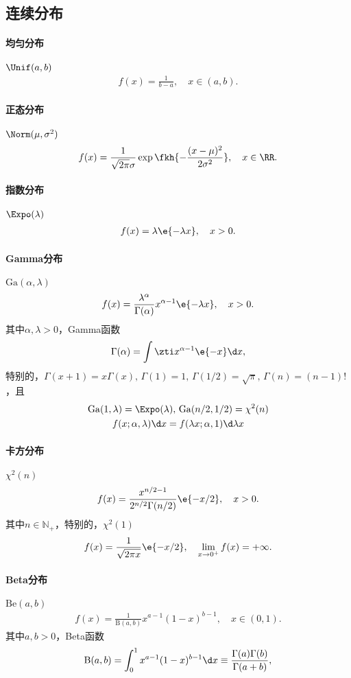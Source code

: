 \subsection{连续分布}
\paragraph{均匀分布}$\Unif(a,b)$
\begin{align}
	f(x)=\frac1{b-a},\quad x\in(a,b).
\end{align}
\paragraph{正态分布}$\Norm(\mu,\sigma^2)$
\begin{align}
	f(x)=\frac1{\sqrt{2\pi}\sigma}\exp\fkh{-\frac{(x-\mu)^2}{2\sigma^2}},\quad x\in\RR.
\end{align}
\paragraph{指数分布}$\Expo(\lambda)$
\begin{align}
	f(x)=\lambda\e{-\lambda x},\quad x>0.
\end{align}
\paragraph{Gamma分布}$\mathrm{Ga}(\alpha,\lambda)$
\begin{align}
	f(x)=\frac{\lambda^\alpha}{\Gamma(\alpha)}x^{\alpha-1}\e{-\lambda x},\quad x>0.
\end{align}
其中$\alpha,\lambda>0$，Gamma函数
\[
	\Gamma(\alpha)=\int\zti x^{\alpha-1}\e{-x}\d x,
\]
特别的，$\Gamma(x+1)=x\Gamma(x),\,\Gamma(1)=1,\,\Gamma(1/2)=\sqrt\pi,\,\Gamma(n)=(n-1)!$，且
\begin{gather*}
	\mathrm{Ga}(1,\lambda)=\Expo(\lambda),\,\mathrm{Ga}(n/2,1/2)=\chi^2(n)\\
	f(x;\alpha,\lambda)\d x=f(\lambda x;\alpha,1)\d\lambda x
\end{gather*}
\paragraph{卡方分布}$\chi^2(n)$
\begin{align}
	f(x)=\frac{x^{n/2-1}}{2^{n/2}\Gamma(n/2)}\e{-x/2},\quad x>0.
\end{align}
其中$n\in\mathbb N_+$，特别的，$\chi^2(1)$
\[
	f(x)=\frac1{\sqrt{2\pi x}}\e{-x/2},\quad\lim_{x\to 0^+}f(x)=+\infty.
\]
\paragraph{Beta分布}$\mathrm{Be}(a,b)$
\begin{align}
	f(x)=\frac1{\mathrm B(a,b)}x^{a-1}(1-x)^{b-1},\quad x\in(0,1).
\end{align}
其中$a,b>0$，Beta函数
\[
	\mathrm B(a,b)=\int_0^1x^{a-1}(1-x)^{b-1}\d x\equiv\frac{\Gamma(a)\Gamma(b)}{\Gamma(a+b)},
\]
